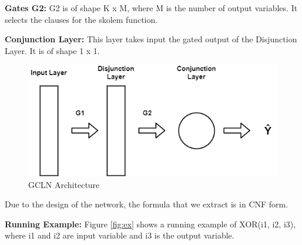 \smallskip
\noindent\textbf{Gates G2:} G2 is of shape K x M, where M is the number of output variables. 
It selects the clauses for the skolem function.

\smallskip
\noindent\textbf{Conjunction Layer:} This layer takes input the gated output of the Disjunction Layer. It is of shape 1 x 1. 

\begin{figure}
	\centering
    \includegraphics[scale=0.4]{gcln.png}
    \caption{GCLN Architecture}
    \label{fig:gcln}
\end{figure}

Due to the design of the network, the formula that we extract is in CNF form.
\newline

\noindent\textbf{Running Example:} Figure \ref{fig:ex} shows a running example of XOR(i1, i2, i3), 
where i1 and i2 are input variable and i3 is the output variable.

